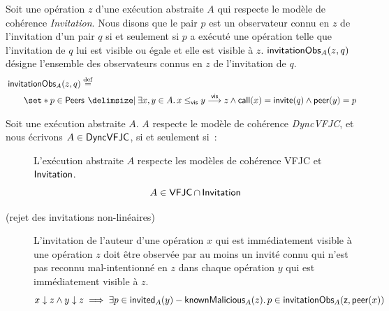 \begin{definition}\label{def:invitation-obs}
Soit une opération $z$ d'une exécution abstraite $A$ qui respecte le modèle de cohérence \emph{Invitation}.
Nous disons que le pair $p$ est un observateur connu en $z$ de l'invitation d'un pair $q$ si et seulement si $p$ a exécuté une opération telle que l'invitation de $q$ lui est visible ou égale et elle est visible à $z$.
$\operatorname{\mathsf{invitationObs}}_A(z, q)$ désigne l'ensemble des observateurs connus en $z$ de l'invitation de $q$.
\begin{equation*}\begin{split}
    \MoveEqLeft\trm{invitationObs}_A(z, q) \defeq\\
    &\set*{p \in \trm{Peers} \given \exists x, y \in A \qsep x \viseq y \vis z \land \trm{call}(x) = \trm{invite}(q) \land \trm{peer}(y) = p}
\end{split}\end{equation*}
\end{definition}

\begin{definition}\label{def:svfjc-consistency}
Soit une exécution abstraite $A$. $A$ respecte le modèle de cohérence \emph{DyncVFJC}, et nous écrivons $A \in \operatorname{\mathsf{DyncVFJC}}$, si et seulement si~:
\begin{description}
  \item[]
  L'exécution abstraite $A$ respecte les modèles de cohérence \acs{VFJC} et $\operatorname{\mathsf{Invitation}}$.
  \begin{equation*}
    A \in \operatorname{\mathsf{VFJC}} \cap \operatorname{\mathsf{Invitation}}
  \end{equation*}
  
  \item[ (rejet des invitations non-linéaires)]
  L'invitation de l'auteur d'une opération $x$ qui est immédiatement visible à une opération $z$ doit être observée par au moins un invité connu qui n'est pas reconnu mal-intentionné en $z$ dans chaque opération $y$ qui est immédiatement visible à $z$.
  \begin{equation*}
      x \downarrow z \land y \downarrow z \implies \exists p \in \operatorname{\mathsf{invited}}_A(y) - \operatorname{\mathsf{knownMalicious}}_A(z) \ldotp p \in \operatorname{\mathsf{invitationObs}}_A(\operatorname{\mathsf{z, peer}}(x))
  \end{equation*}
  \end{description}
\end{definition}

